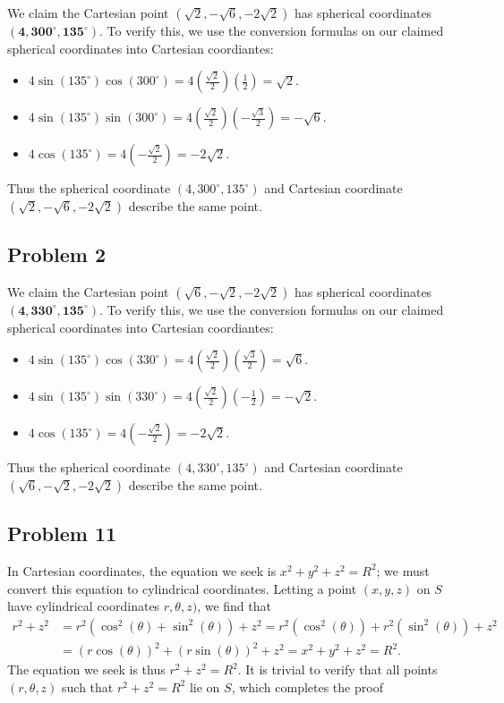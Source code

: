 \documentclass[11pt]{article}
\begin{document}
We claim the Cartesian point $(\sqrt{2}, -\sqrt{6}, -2\sqrt{2})$ has spherical coordinates $\mathbf{(4, 300^{\circ}, 135^{\circ})}$. To verify this, we use the conversion formulas on our claimed spherical coordinates into Cartesian coordiantes:
\begin{itemize}
	\item $4 \sin(135^{\circ})\cos(300^{\circ}) = 4\left(\tfrac{\sqrt{2}}{2}\right)\left(\tfrac{1}{2}\right) = \sqrt{2}$.
	\item $4 \sin(135^{\circ})\sin(300^{\circ}) = 4\left(\tfrac{\sqrt{2}}{2}\right)\left(-\tfrac{\sqrt{3}}{2}\right) = -\sqrt{6}$.
	\item $4 \cos(135^{\circ}) = 4\left(-\tfrac{\sqrt{2}}{2}\right) = -2\sqrt{2}$. 
\end{itemize}
Thus the spherical coordinate $(4, 300^{\circ}, 135^{\circ})$ and Cartesian coordinate $(\sqrt{2}, -\sqrt{6}, -2\sqrt{2})$ describe the same point.

\subsection*{Problem 2}

We claim the Cartesian point $(\sqrt{6}, -\sqrt{2}, -2\sqrt{2})$ has spherical coordinates $\mathbf{(4, 330^{\circ}, 135^{\circ})}$. To verify this, we use the conversion formulas on our claimed spherical coordinates into Cartesian coordiantes:
\begin{itemize}
	\item $4 \sin(135^{\circ})\cos(330^{\circ}) = 4\left(\tfrac{\sqrt{2}}{2}\right)\left(\tfrac{\sqrt{3}}{2}\right) = \sqrt{6}$.
	\item $4 \sin(135^{\circ})\sin(330^{\circ}) = 4\left(\tfrac{\sqrt{2}}{2}\right)\left(-\tfrac{1}{2}\right) = -\sqrt{2}$.
	\item $4 \cos(135^{\circ}) = 4\left(-\tfrac{\sqrt{2}}{2}\right) = -2\sqrt{2}$. 
\end{itemize}
Thus the spherical coordinate $(4, 330^{\circ}, 135^{\circ})$ and Cartesian coordinate $(\sqrt{6}, -\sqrt{2}, -2\sqrt{2})$ describe the same point.

\subsection*{Problem 11}

In Cartesian coordinates, the equation we seek is $x^{2} + y^{2} + z^{2} = R^{2}$; we must convert this equation to cylindrical coordinates. Letting a point $(x, y, z)$ on $S$ have cylindrical coordinates $r, \theta, z)$, we find that 
\begin{align*}
	r^{2} + z^{2} &= r^{2} (\cos^{2}(\theta) + \sin^{2}(\theta)) + z^{2} = r^{2} (\cos^{2}(\theta)) + r^{2} (\sin^{2}(\theta)) + z^{2} \\
	&= (r \cos(\theta))^{2} + (r \sin(\theta))^{2} + z^{2} = x^{2} + y^{2} + z^{2} = R^{2}.
\end{align*}
The equation we seek is thus $r^{2} + z^{2} = R^{2}$. It is trivial to verify that all points $(r, \theta, z)$ such that $r^{2} + z^{2} = R^{2}$ lie on $S$, which completes the proof
\end{document}
